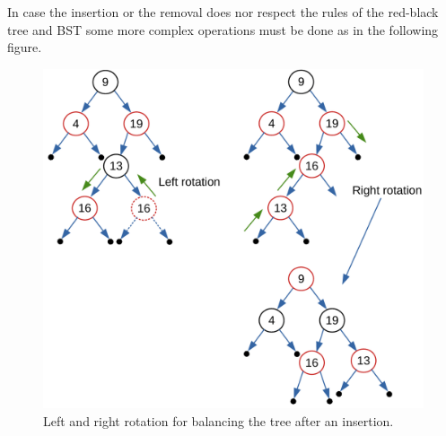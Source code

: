 In case the insertion or the removal does nor respect the rules of the red-black tree and BST some more complex operations must be done as in the following figure.

\begin{figure}[H]
	\begin{center}
		\includegraphics[scale=.6]{chapters/trees/images/trees_22.pdf}
		\caption[Left and right rotation for balancing the tree after an insertion.]{Left and right rotation for balancing the tree after an insertion.}
		\label{trees_22}
	\end{center}
\end{figure}